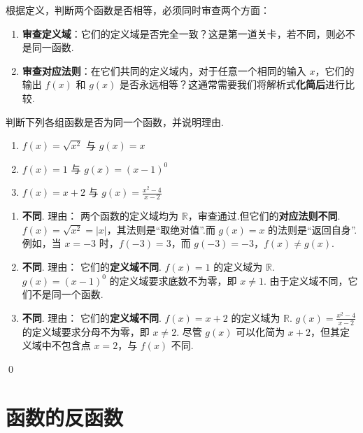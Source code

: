 \begin{note}[两步审查法]
	根据定义，判断两个函数是否相等，必须同时审查两个方面：
	\begin{enumerate}
		\item \textbf{审查定义域}：它们的定义域是否完全一致？这是第一道关卡，若不同，则必不是同一函数.
		\item \textbf{审查对应法则}：在它们共同的定义域内，对于任意一个相同的输入 $x$，它们的输出 $f(x)$ 和 $g(x)$ 是否永远相等？这通常需要我们将解析式\textbf{化简后}进行比较.
	\end{enumerate}
\end{note}

\begin{exercise}
	判断下列各组函数是否为同一个函数，并说明理由.
	\begin{enumerate}
		\item $f(x) = \sqrt{x^2}$ 与 $g(x) = x$
		\item $f(x) = 1$ 与 $g(x) = (x-1)^0$
		\item $f(x) = x+2$ 与 $g(x) = \frac{x^2-4}{x-2}$
	\end{enumerate}
\end{exercise}
\begin{solution}
	\begin{enumerate}
		\item \textbf{不同}.
		\textcolor{green!50!black}{理由：} 两个函数的定义域均为 $\mathbb{R}$，审查通过.但它们的\textbf{对应法则不同}.
		$f(x) = \sqrt{x^2} = |x|$，其法则是“取绝对值”.而 $g(x)=x$ 的法则是“返回自身”.例如，当 $x=-3$ 时，$f(-3)=3$，而 $g(-3)=-3$，$f(x) \neq g(x)$.
		
		\item \textbf{不同}.
		\textcolor{green!50!black}{理由：} 它们的\textbf{定义域不同}.
		$f(x)=1$ 的定义域为 $\mathbb{R}$.
		$g(x)=(x-1)^0$ 的定义域要求底数不为零，即 $x \neq 1$.
		由于定义域不同，它们不是同一个函数.
		
		\item \textbf{不同}.
		\textcolor{green!50!black}{理由：} 它们的\textbf{定义域不同}.
		$f(x)=x+2$ 的定义域为 $\mathbb{R}$.
		$g(x)=\frac{x^2-4}{x-2}$ 的定义域要求分母不为零，即 $x \neq 2$.
		尽管 $g(x)$ 可以化简为 $x+2$，但其定义域中不包含点 $x=2$，与 $f(x)$ 不同.
	\end{enumerate}
\end{solution}
\qed

\section{函数的反函数}


